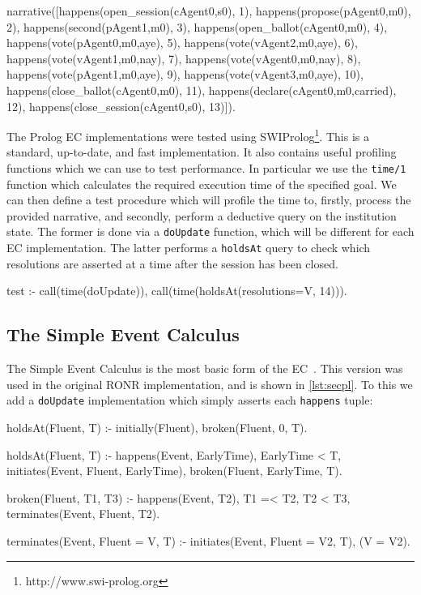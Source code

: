 \begin{prolog}[caption=RONR narrative with one motion passed,label=lst:ronrnarr]
narrative([happens(open_session(cAgent0,s0), 1),
	happens(propose(pAgent0,m0), 2),
	happens(second(pAgent1,m0), 3),
	happens(open_ballot(cAgent0,m0), 4),
	happens(vote(pAgent0,m0,aye), 5),
	happens(vote(vAgent2,m0,aye), 6),
	happens(vote(vAgent1,m0,nay), 7),
	happens(vote(vAgent0,m0,nay), 8),
	happens(vote(pAgent1,m0,aye), 9),
	happens(vote(vAgent3,m0,aye), 10),
	happens(close_ballot(cAgent0,m0), 11),
	happens(declare(cAgent0,m0,carried), 12),
	happens(close_session(cAgent0,s0), 13)]).
\end{prolog}

The Prolog \ac{EC} implementations were tested using SWIProlog\footnote{http://www.swi-prolog.org}.
This is a standard, up-to-date, and fast implementation. It also contains useful
profiling functions which we can use to test performance. In particular we use
the \texttt{time/1} function which calculates the required execution time of the
specified goal. We can then define a test procedure which will profile
the time to, firstly, process the provided narrative, and secondly, perform a
deductive query on the institution state. The former is done via a \texttt{doUpdate}
function, which will be different for each \ac{EC} implementation. The latter
performs a \texttt{holdsAt} query to check which resolutions are asserted at a
time after the session has been closed.

\begin{prologinline}
test :-
	call(time(doUpdate)),
	call(time(holdsAt(resolutions=V, 14))).
\end{prologinline}

\subsection{The Simple Event Calculus}

The Simple Event Calculus is the most basic form of the \ac{EC}~\citep{Shanahan1999}.
This version was used in the original \ac{RONR} implementation, and is shown in \autoref{lst:secpl}. To this we add a \texttt{doUpdate} implementation which simply asserts each
\texttt{happens} tuple:

\begin{prolog}[caption=Prolog implementation of the Simple Event Calculus,label=lst:secpl]
holdsAt(Fluent, T) :-
	initially(Fluent),
	\+ broken(Fluent, 0, T).

holdsAt(Fluent, T) :-
	happens(Event, EarlyTime),
	EarlyTime < T,
	initiates(Event, Fluent, EarlyTime),
	\+ broken(Fluent, EarlyTime, T).

broken(Fluent, T1, T3) :-
	happens(Event, T2),
	T1 =< T2,
	T2 < T3,
	terminates(Event, Fluent, T2).

terminates(Event, Fluent = V, T) :-
	initiates(Event, Fluent = V2, T),
	\+ (V = V2).
\end{prolog}

